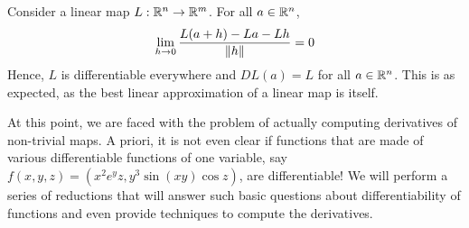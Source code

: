 \documentclass[../Analysis-3.tex]{subfiles}
\begin{document}
\begin{Eg}{}{}
  Consider a linear map $ L:\mathbb{R}^n \to \mathbb{R}^m $. For all $ a \in \mathbb{R}^n $,
  \[ \lim_{h \to 0} \frac{L(a+h)-La-Lh}{\norm{h}} = 0 \]
  Hence, $ L $ is differentiable everywhere and $ DL(a) = L $ for all $ a \in \mathbb{R}^n $. This is as expected, as the best linear approximation of a linear map is itself.
\end{Eg}

At this point, we are faced with the problem of actually computing derivatives of non-trivial maps. A priori, it is not even clear if functions that are made of various differentiable functions of one variable, say $ f(x,y,z) = (x^2e^yz, y^3\sin (xy) \cos z) $, are differentiable! We will perform a series of reductions that will answer such basic questions about differentiability of functions and even provide techniques to compute the derivatives.
\end{document}
